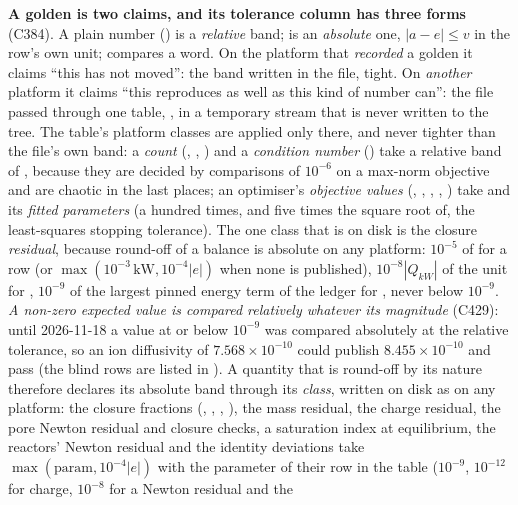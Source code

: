 \documentclass[11pt,a4paper]{article}
\begin{document}
\begin{keyidea}
\medskip\noindent\textbf{A golden is two claims, and its tolerance column has three
forms} (C384).  A plain number () is a \emph{relative} band;
 is an \emph{absolute} one, $|a-e|\le v$ in the row's own unit;
 compares a word.  On the platform that \emph{recorded} a golden it
claims ``this has not moved'': the band written in the file, tight.  On
\emph{another} platform it claims ``this reproduces as well as this kind of
number can'': the file passed through one table,
, in a temporary stream that is never written
to the tree.  The table's platform classes are applied only there, and never
tighter than the file's own band: a \emph{count} (,
, ) and a \emph{condition number}
() take a relative band of , because they are decided
by comparisons of $10^{-6}$ on a max-norm objective and are chaotic in the last
places; an optimiser's \emph{objective values} (, ,
, , ) take  and its
\emph{fitted parameters}  (a hundred times, and five times the square
root of, the least-squares stopping tolerance).  The one class that is on disk is
the closure \emph{residual}, because round-off of a balance is absolute on any
platform: $10^{-5}$ of  for a  row (or
$\max(10^{-3}\,\mathrm{kW},10^{-4}|e|)$ when none is published),
$10^{-8}|Q_{kW}|$ of the unit for , $10^{-9}$ of the
largest pinned energy term of the ledger for , never
below $10^{-9}$.  \emph{A non-zero expected value is compared relatively
whatever its magnitude} (C429): until 2026-11-18 a value at or below $10^{-9}$
was compared absolutely at the relative tolerance, so an ion diffusivity of
$7.568\times10^{-10}$ could publish $8.455\times10^{-10}$ and pass (the
blind rows are listed in ).  A quantity that is round-off by its nature
therefore declares its absolute band through its \emph{class}, written on disk
as  on any platform: the closure fractions
(, ,
, ), the mass residual, the charge
residual, the pore Newton residual and closure checks, a saturation index at equilibrium, the reactors' Newton
residual and the identity deviations take
$\max(\mathrm{param},10^{-4}|e|)$ with the parameter of their row in the table
($10^{-9}$, $10^{-12}$ for charge, $10^{-8}$ for a Newton residual and the

\end{keyidea}
\end{document}
